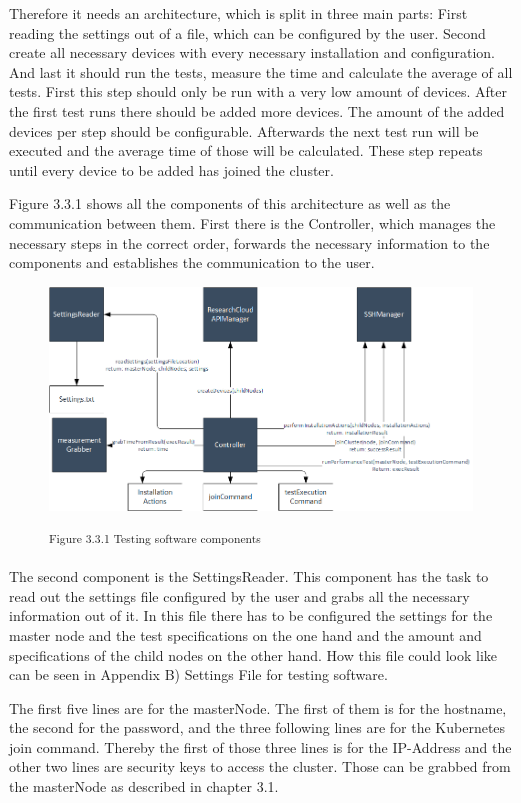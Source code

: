 Therefore it needs an architecture, which is split in three main parts: First reading the settings out of a file, which can be configured by the user. Second create all necessary devices with every necessary installation and configuration. And last it should run the tests, measure the time and calculate the average of all tests. First this step should only be run with a very low amount of devices. After the first test runs there should be added more devices. The amount of the added devices per step should be configurable. Afterwards the next test run will be executed and the average time of those will be calculated. These step repeats until every device to be added has joined the cluster.

Figure 3.3.1 shows all the components of this architecture as well as the communication between them. First there is the Controller, which manages the necessary steps in the correct order, forwards the necessary information to the components and establishes the communication to the user.

\begin{figure}[h]
\centering
\includegraphics[width=\textwidth]{images/testing_software_components.png}

\textsuperscript{Figure 3.3.1 Testing software components}
\end{figure}

The second component is the SettingsReader. This component has the task to read out the settings file configured by the user and grabs all the necessary information out of it. In this file there has to be configured the settings for the master node and the test specifications on the one hand and the amount and specifications of the child nodes on the other hand. How this file could look like can be seen in Appendix B) Settings File for testing software.

The first five lines are for the masterNode. The first of them is for the hostname, the second for the password, and the three following lines are for the Kubernetes join command. Thereby the first of those three lines is for the IP-Address and the other two lines are security keys to access the cluster. Those can be grabbed from the masterNode as described in chapter 3.1.

